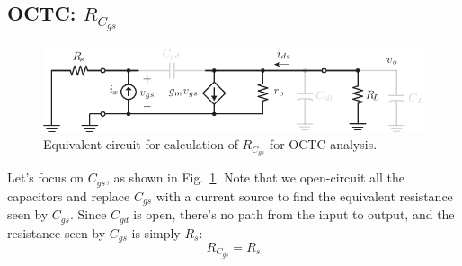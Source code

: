 \subsection{OCTC: \texorpdfstring{$R_{C_{gs}}$}{Equivalent Gate-Source Capacitor Resistance}}
\begin{figure}[tb]
\centering
\includegraphics[scale=1]{cs_amp_ac_caps_Cgs}
\caption{Equivalent circuit for calculation of $R_{C_{gs}}$ for OCTC analysis.} \label{fig:cs_amp_ac_caps_Cgs}
\end{figure}
Let's focus on $C_{gs}$, as shown in Fig.~\ref{fig:cs_amp_ac_caps_Cgs}. Note that we open-circuit all the capacitors and replace $C_{gs}$ with a current source to find the equivalent resistance seen by $C_{gs}$.
 Since $C_{gd}$ is open, there's no path from the input to output, and the resistance seen by $C_{gs}$ is simply $R_s$:
    \begin{equation}
        {R_{C_{gs}}} = R_{s}
    \end{equation}
